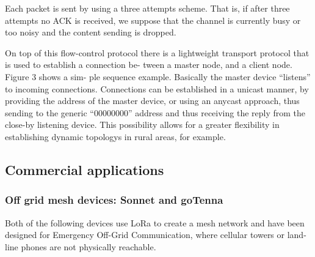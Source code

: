 		Each packet is sent by using a three attempts scheme. That
		is, if after three attempts no ACK is received, we suppose
		that the channel is currently busy or too noisy and the content
		sending is dropped.
		
		On top of this ﬂow-control protocol there is a lightweight
		transport protocol that is used to establish a connection be-
		tween a master node, and a client node. Figure 3 shows a sim-
		ple sequence example. Basically the master device “listens”
		to incoming connections. Connections can be established in a
		unicast manner, by providing the address of the master device,
		or using an anycast approach, thus sending to the generic
		“00000000” address and thus receiving the reply from the
		close-by listening device. This possibility allows for a greater
		ﬂexibility in establishing dynamic topologys in rural areas, for
		example.
		

		\subsection{Commercial applications}

			\subsubsection{Off grid mesh devices: Sonnet and goTenna}
			
				Both of the following devices use LoRa to create a mesh network and have been designed for Emergency Off-Grid Communication, where cellular towers or land-line phones are not physically reachable.
				
